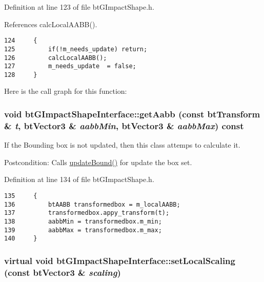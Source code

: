 Definition at line 123 of file btGImpactShape.h.

References calcLocalAABB().

\begin{Code}\begin{verbatim}124     {
125         if(!m_needs_update) return;
126         calcLocalAABB();
127         m_needs_update  = false;
128     }
\end{verbatim}
\end{Code}




Here is the call graph for this function:\hypertarget{classbt_g_impact_shape_interface_418d1f35f4dd58e4d3195aee639b615b}{
\subsubsection[getAabb]{\setlength{\rightskip}{0pt plus 5cm}void btGImpactShapeInterface::getAabb (const btTransform \& {\em t}, \/  btVector3 \& {\em aabbMin}, \/  btVector3 \& {\em aabbMax}) const}}
\label{classbt_g_impact_shape_interface_418d1f35f4dd58e4d3195aee639b615b}


If the Bounding box is not updated, then this class attemps to calculate it. 

\begin{Desc}
\item[Postcondition:]Calls \hyperlink{classbt_g_impact_shape_interface_cb26c2d7a2aecabd06b996b72b848492}{updateBound()} for update the box set. \end{Desc}


Definition at line 134 of file btGImpactShape.h.

\begin{Code}\begin{verbatim}135     {
136         btAABB transformedbox = m_localAABB;
137         transformedbox.appy_transform(t);
138         aabbMin = transformedbox.m_min;
139         aabbMax = transformedbox.m_max;
140     }
\end{verbatim}
\end{Code}


\hypertarget{classbt_g_impact_shape_interface_dec0bd43cd0105b1d0dc172bc7db50d8}{
\subsubsection[setLocalScaling]{\setlength{\rightskip}{0pt plus 5cm}virtual void btGImpactShapeInterface::setLocalScaling (const btVector3 \& {\em scaling})}}
\label{classbt_g_impact_shape_interface_dec0bd43cd0105b1d0dc172bc7db50d8}


